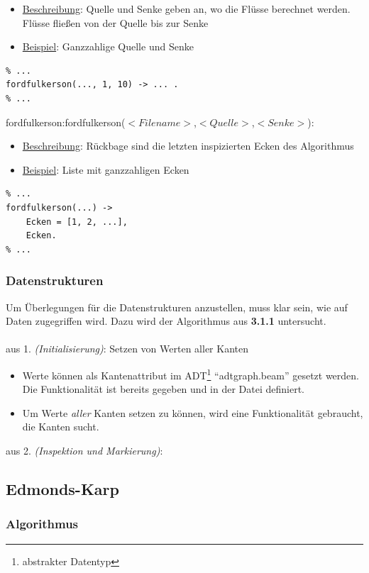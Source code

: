 \documentclass[11pt]{article}
\begin{document}
\begin{itemize}
\item \underline{Beschreibung}: Quelle und Senke geben an, wo die Fl\"usse berechnet werden. Fl\"usse flie\ss{}en von der Quelle bis zur Senke
\item \underline{Beispiel}: Ganzzahlige Quelle und Senke
\end{itemize}
\begin{lstlisting}
% ...
fordfulkerson(..., 1, 10) -> ... .
% ...
\end{lstlisting}
fordfulkerson:fordfulkerson($<Filename>$,$<Quelle>$,$<Senke>$):\\ 
\begin{itemize}
\item \underline{Beschreibung}: R\"uckbage sind die letzten inspizierten Ecken des Algorithmus
\item \underline{Beispiel}: Liste mit ganzzahligen Ecken
\end{itemize}
\begin{lstlisting}
% ...
fordfulkerson(...) ->
    Ecken = [1, 2, ...],
    Ecken.
% ...
\end{lstlisting}

\subsubsection{Datenstrukturen}
Um \"Uberlegungen f\"ur die Datenstrukturen anzustellen, muss klar sein, wie auf Daten zugegriffen wird. Dazu  wird der Algorithmus aus \textbf{3.1.1} untersucht.\\~\\
aus 1. \textit{(Initialisierung)}: Setzen von Werten aller Kanten
\begin{itemize}
    \item Werte k\"onnen als Kantenattribut im ADT\footnote{abstrakter Datentyp} "`adtgraph.beam"' gesetzt werden. Die Funktionalit\"at ist bereits gegeben und in der Datei definiert.
    \item Um Werte \textit{aller} Kanten setzen zu k\"onnen, wird eine Funktionalit\"at gebraucht, die Kanten sucht.
\end{itemize}
aus 2. \textit{(Inspektion und Markierung)}:

\subsection{Edmonds-Karp}
\subsubsection{Algorithmus}
\end{document}
